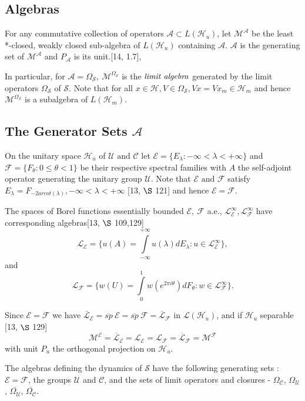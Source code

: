 \documentclass[req no]{amsart}[16pt]
\theoremstyle{plain}
\theoremstyle{definition}
\numberwithin{equation}{section}\setcounter{page}{1}
\def\m{\mbox}
\def\ma{\m{ and }}
\def\O{\Omega}
\def\h{\mathcal{H}}
\def\E {\mathcal{E}}
\def\L {\mathcal{L}}
\def\M {\mathcal{M}}
\def\F {\mathcal{F}}
\def\s{\mathcal{S}}
\def\A{\mathcal{A}}
\def\C{\mathcal{C}}
\def\U{\mathcal{U}}
\begin{document}
\subsection{Algebras}
For any commutative collection of operators $\mathcal{A} \subset L(\h_{u})$, let $\M^{\A}$ be the least *-closed, weakly closed sub-algebra of $L(\h_{u})$ containing $\mathcal{A}$. $\mathcal{A}$ is the generating set of $\M^{\A}$ and $P_{\A}$ is its unit.[14, 1.7],

In particular, for $\mathcal{A} = \O_{\s} ,~ \M^{\Omega_{\s}}$ is the $\emph{limit algebra}$ generated by the limit operators $\Omega_{\s}$ of $\s$. Note that for all $x \in \h, V \in \Omega_{\s}, Vx = Vx_{m}\in \h_{m} $ and hence $\M^{\Omega_{\s}}$ is a subalgebra of $L(\h_{m})$.


\subsection{The Generator Sets $\A$}

  On the unitary space $\h_{u}$ of $\U \ma \C$ let $\E = \{E_\lambda:-\infty<\lambda<+\infty\}$ and $\F = \{F_\theta:0\leq\theta< 1\}$ be their respective spectral families with $A$ the self-adjoint operator generating the unitary group $\U$. Note that $\mathcal{E} \ma \mathcal{F}$ satisfy $E_\lambda = F_{-2arcot(\lambda)}, -\infty<\lambda<+\infty$ [13, $\S$ 121] and hence $ \mathcal{E} = \mathcal{F} $.

   The spaces of Borel functions essentially bounded $\E,~ \F$ a.e., $\L^{\infty}_{\E}, \L^{\infty}_{\F}$ have corresponding algebras[13, $\S$ 109,129]
   $$\mathcal{L}_{\mathcal{E}} = \{u(A)=\int\limits^{+\infty}_{-\infty}u(\lambda)dE_\lambda: u \in \L^{\infty}_{\E}\},$$ and
   $$ \mathcal{L}_{\mathcal{F}}= \{w(U) =\int\limits^{1}_{0}w(e^{2 \pi i \theta})dF_\theta:w \in \L^{\infty}_{\F}\}. $$

  Since $ \mathcal{E} = \mathcal{F} $ we have $\overline{\mathcal{L}}_{\mathcal{E}}= \overline{sp}~\mathcal{E}=\overline{sp}~\mathcal{F} =  \overline{\mathcal{L}}_{\mathcal{F}}$ in $\L(\h_{u})$, and if $\h_{u}$ separable [13, $\S$ 129] $$\M^\mathcal{E} = \overline{\mathcal{L}}_{\mathcal{E}} = {\mathcal{L}}_{\mathcal{E}} = {\mathcal{L}}_{\mathcal{F}} = \overline{{\mathcal{L}}}_{\mathcal{F}}= \M^\mathcal{F}$$ with unit $P_{u}$ the orthogonal projection on $\h_{u}$.

The algebras  defining the dynamics of $\s$ have the following generating sets :
$ \mathcal{E}=\mathcal{F} $, the groups $\mathcal{U}$ and $\mathcal{C}$, and the sets of limit operators and closures - $\Omega_{\C}$, $\Omega_{\U}$, $\overline{\Omega_{\U}}$, $\overline{\Omega_{\C}}$.
\end{document}
